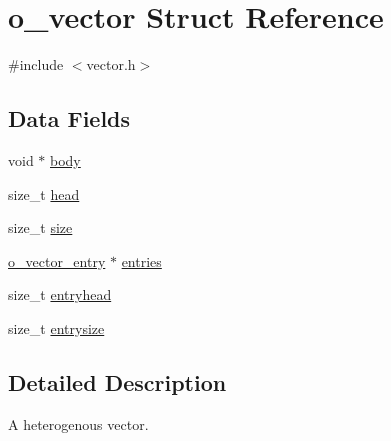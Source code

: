 \hypertarget{structo__vector}{\section{o\-\_\-vector Struct Reference}
\label{structo__vector}
}


{\ttfamily \#include $<$vector.\-h$>$}

\subsection*{Data Fields}
\begin{DoxyCompactItemize}
\item 
void $\ast$ \hyperlink{structo__vector_a0aca2da3dc9eeab18d0bad8b04c2bcb9}{body}
\item 
size\-\_\-t \hyperlink{structo__vector_ae2e1b8deee911c2e19c9371426ea3a34}{head}
\item 
size\-\_\-t \hyperlink{structo__vector_a0d1fd9fad9798e2368ae2627ab01d369}{size}
\item 
\hyperlink{structo__vector__entry}{o\-\_\-vector\-\_\-entry} $\ast$ \hyperlink{structo__vector_a5620bad6792e745bbd7748eb573b46cf}{entries}
\item 
size\-\_\-t \hyperlink{structo__vector_ad1219a8e6f11e3e86fce2335f547d92a}{entryhead}
\item 
size\-\_\-t \hyperlink{structo__vector_a6084c0adf02069de9e78ae01e9b9d31d}{entrysize}
\end{DoxyCompactItemize}


\subsection{Detailed Description}
A heterogenous vector. 

